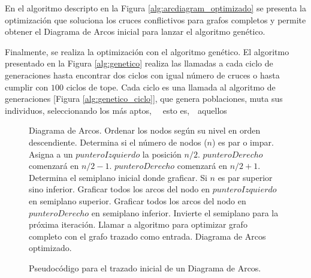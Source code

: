 	En el algoritmo descripto en la Figura \ref{alg:arcdiagram_optimizado} se presenta la optimización que soluciona los cruces conflictivos para grafos completos y permite obtener el Diagrama de Arcos inicial para lanzar el algoritmo genético.
	
	Finalmente,  se realiza la optimización con el algoritmo genético. El algoritmo presentado en la Figura \ref{alg:genetico} realiza las llamadas a cada ciclo de generaciones hasta encontrar dos ciclos con igual número de cruces o hasta cumplir con $100$ ciclos de tope. Cada ciclo es una llamada al algoritmo de 	generaciones [Figura \ref{alg:genetico_ciclo}], que genera poblaciones,  muta sus individuos, seleccionando los más aptos, \ \ esto es,\ \  aquellos 
		
	\begin{figure}
	    \begin{center}
		\begin{algorithmic}[1]
			\REQUIRE Diagrama de Arcos.
			\STATE Ordenar los nodos según su nivel en orden descendiente.
			\STATE Determina si el número de nodos ($n$) es par o impar.
			\STATE Asigna a un $punteroIzquierdo$ la posición $n/2$.
			\STATE $punteroDerecho$ comenzará en $n/2 - 1 $.
			\ELSE
			\STATE $punteroDerecho$ comenzará en $n/2 + 1 $.
			\ENDIF
			\STATE Determina el semiplano inicial donde graficar. Si $n$ es par superior sino inferior.
			\STATE Graficar todos los arcos del nodo en $punteroIzquierdo$ en semiplano superior.
			\ELSE 
			\STATE Graficar todos los arcos del nodo en $punteroDerecho$ en semiplano inferior.
			\ENDIF
			\STATE Invierte el semiplano para la próxima iteración.
			\ENDFOR
			\STATE Llamar a algoritmo para optimizar grafo completo con el grafo trazado como entrada.
			\ENSURE Diagrama de Arcos optimizado.
		\end{algorithmic}
	    \end{center}

		\caption{Pseudocódigo para el trazado inicial de un Diagrama de Arcos.}
		\label{alg:arcdiagram_trazado}
	\end{figure}
  
